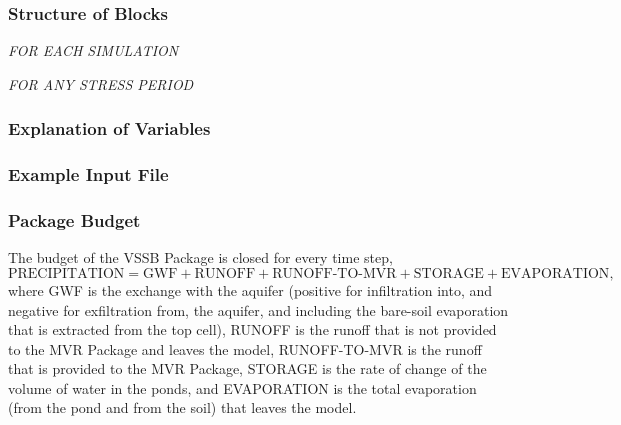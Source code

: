 \vspace{5mm}
\subsubsection{Structure of Blocks}
\vspace{5mm}

\noindent \textit{FOR EACH SIMULATION}




\vspace{5mm}
\noindent \textit{FOR ANY STRESS PERIOD}


\vspace{5mm}
\subsubsection{Explanation of Variables}
\begin{description}

\end{description}

\vspace{5mm}
\subsubsection{Example Input File}


\vspace{5mm}
\subsubsection{Package Budget}
The budget of the VSSB Package is closed for every time step,
\begin{equation}
\text{PRECIPITATION} = \text{GWF} + \text{RUNOFF} + \text{RUNOFF-TO-MVR} + \text{STORAGE} + \text{EVAPORATION},
\end{equation}
where GWF is the exchange with the aquifer (positive for infiltration into, and negative for exfiltration from, the aquifer, and including the bare-soil evaporation that is extracted from the top cell), RUNOFF is the runoff that is not provided to the MVR Package and leaves the model, RUNOFF-TO-MVR is the runoff that is provided to the MVR Package, STORAGE is the rate of change of the volume of water in the ponds, and EVAPORATION is the total evaporation (from the pond and from the soil) that leaves the model.

